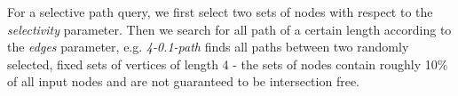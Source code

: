 For a selective path query, we first select two sets of nodes with respect to the \textit{selectivity} parameter.
Then we search for all path of a certain length according to the \textit{edges} parameter, e.g. \textit{4-0.1-path} finds all
paths between two randomly selected, fixed sets of vertices of length 4 - the sets of nodes contain roughly 10\% of all input nodes and are not guaranteed to be intersection free.

